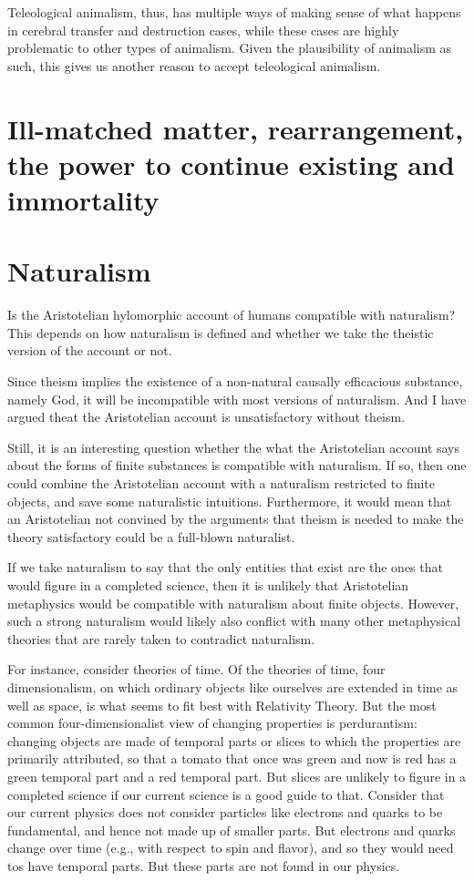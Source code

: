 Teleological animalism, thus, has multiple ways of making sense of what happens in cerebral transfer and destruction cases, while these cases
are highly problematic to other types of animalism. Given the plausibility of animalism as such, this gives us another reason to accept
teleological animalism.

\section{Ill-matched matter, rearrangement, the power to continue existing and immortality}
\section{Naturalism}
Is the Aristotelian hylomorphic account of humans compatible with naturalism? This depends on how naturalism
is defined and whether we take the theistic version of the account or not.

Since theism implies the existence of a non-natural causally efficacious substance, namely God, it will be incompatible
with most versions of naturalism. And I have argued theat the Aristotelian account is unsatisfactory without
theism. 

Still, it is an interesting question whether the what the Aristotelian account says about the forms of finite
substances is compatible with naturalism. If so, then one could combine the Aristotelian account with 
a naturalism restricted to finite objects, and save some naturalistic intuitions. Furthermore, it would mean
that an Aristotelian not convined by the arguments that theism is needed to make the theory satisfactory could
be a full-blown naturalist.

If we take naturalism to say that the only entities that exist are the ones that would figure in a completed science,
then it is unlikely that Aristotelian metaphysics would be compatible with naturalism about finite objects. However,
such a strong naturalism would likely also conflict with many other metaphysical theories that are rarely taken to 
contradict naturalism. 

For instance, consider theories of time. Of the theories of time, four dimensionalism, on which
ordinary objects like ourselves are extended in time as well as space, is what seems to fit best with Relativity Theory. 
But the most common four-dimensionalist view of changing properties is perdurantism: changing objects are made of temporal parts or
slices to which the properties are primarily attributed, so that a tomato that once was green and now is red has a green temporal part
and a red temporal part. But slices are unlikely to figure in a completed science if
our current science is a good guide to that. Consider that our current physics does not consider particles
like electrons and quarks to be fundamental, and hence not made up of smaller parts. But electrons and quarks change over
time (e.g., with respect to spin and flavor), and so they would need tos have temporal parts.  But these parts are not found
in our physics. 

